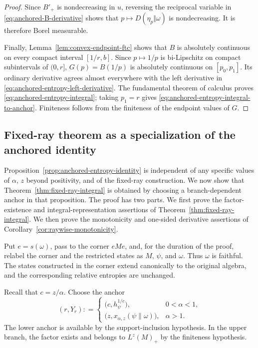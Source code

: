 \documentclass[12pt]{article}
\numberwithin{equation}{section}
\theoremstyle{definition}
\theoremstyle{remark}
\newcommand{\?}{\overset{?}{=}}
\newcommand{\defeq}{\mathrel{\mathop:}=}
\begin{document}
\begin{proof}
Since $B'_+$ is nondecreasing in $u$, reversing the reciprocal variable
in \eqref{eq:anchored-B-derivative} shows that
$p\mapsto D(\eta_p\Vert\omega)$ is nondecreasing.  It is therefore Borel
measurable.

Finally, Lemma~\ref{lem:convex-endpoint-ftc} shows that $B$ is absolutely
continuous on every compact interval $[1/r,b]$.  Since $p\mapsto1/p$ is
bi-Lipschitz on compact subintervals of $(0,r]$, $G(p)=B(1/p)$ is
absolutely continuous on $[p_0,p_1]$.  Its ordinary derivative agrees
almost everywhere with the left derivative in
\eqref{eq:anchored-entropy-left-derivative}.  The fundamental theorem of
calculus proves \eqref{eq:anchored-entropy-integral}; taking $p_1=r$
gives \eqref{eq:anchored-entropy-integral-to-anchor}.  Finiteness follows
from the finiteness of the endpoint values of $G$.
\end{proof}

\subsection{Fixed-ray theorem as a specialization of the anchored identity}
\label{subsec:fixed-ray-proof}

Proposition~\ref{prop:anchored-entropy-identity} is 
independent of any specific values of
$\alpha$, $z$ beyond positivity, and of the fixed-ray construction.  We now show that
Theorem~\ref{thm:fixed-ray-integral} is obtained by choosing a
branch-dependent anchor in that proposition. The proof has two parts. 
We first prove the factor-existence and
integral-representation assertions of Theorem~\ref{thm:fixed-ray-integral}.  We then prove the
monotonicity and one-sided derivative assertions of Corollary~\ref{cor:raywise-monotonicity}.

Put $e=s(\omega)$, pass to the corner $eMe$, and, for the duration of the
proof, relabel the corner and the restricted states as $M$, $\psi$, and
$\omega$.  Thus $\omega$ is faithful.  The states constructed in the
corner extend canonically to the original algebra, and the corresponding
relative entropies are unchanged.

Recall that $c=z/\alpha$.  Choose the anchor
\begin{equation}
  (r,Y_r)\defeq
  \begin{cases}
    \bigl(c,h_\psi^{1/c}\bigr),
      &0<\alpha<1,\\[0.5ex]
    \bigl(z,x_{\alpha,z}(\psi\|\omega)\bigr),
      &\alpha>1.
  \end{cases}
  \label{eq:fixed-ray-anchor}
\end{equation}
The lower anchor is available by the support-inclusion hypothesis.  In
the upper branch, the factor exists and belongs to $L^z(M)_+$ by the
finiteness hypothesis.
\end{document}
